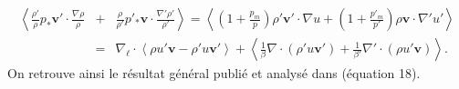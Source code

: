 \begin{eqnarray}
\label{eq:turb_ref_beta}    \left<\frac{\rho'}{\rho} p_*  \boldsymbol{v'} \cdot \frac{\nabla \rho}{\rho} \right.&+& \left.\frac{\rho}{\rho'} p'_*  \boldsymbol{v} \cdot \frac{\nabla' \rho'}{\rho'} \right> = \left<\left(1+\frac{p_m}{p}\right)\rho' \boldsymbol{v'} \cdot \nabla u + \left(1+\frac{p'_m}{p'}\right)\rho \boldsymbol{v} \cdot \nabla' u'\right>\nonumber \\ &=& \nabla_{\boldsymbol{\ell}} \cdot \left<\rho u' \boldsymbol{v} - \rho' u \boldsymbol{v'}\right> + \left<\frac{1}{\beta}\nabla\cdot\left(\rho'  u \boldsymbol{v'}\right)  + \frac{1}{\beta'}\nabla'\cdot\left(\rho u'\boldsymbol{v}\right)   \right> .
\end{eqnarray}
On retrouve ainsi le résultat général publié et analysé dans \cite{simon_general_2021} (équation 18).

